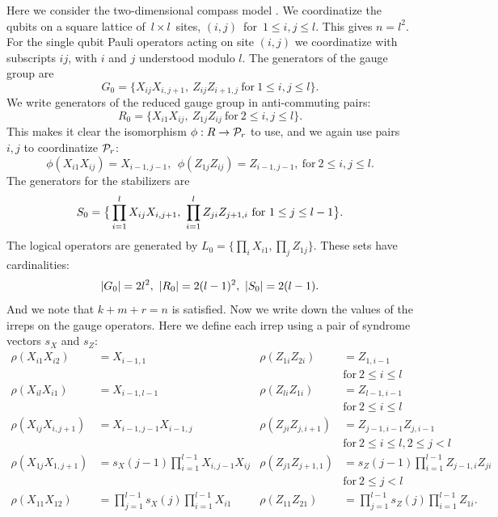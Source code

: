 \documentclass[12pt]{article}
\begin{document}
Here we consider the two-dimensional compass model \cite{Bacon2006}.
We coordinatize the qubits on a square 
lattice of\ $l\times l$\ sites,
$(i, j)$\ for\ $1\le i, j\le l.$
This gives $n = l^2.$
For the single qubit Pauli operators acting on site
$(i, j)$ we coordinatize with subscripts $ij$, 
with $i$ and $j$ understood modulo $l$.
The generators of the gauge group are
$$
    G_0 = \big\{ X_{ij}X_{i,j+1},\ Z_{ij}Z_{i+1,j}\ \mbox{for}\ 1\le i, j\le l\big\}.
$$
We write generators of the reduced
gauge group in anti-commuting pairs:
$$
    R_0 = \big\{ X_{i1}X_{ij},\ Z_{1j}Z_{ij}\ \mbox{for}\ 2\le i, j\le l\big\}.
$$
This makes it clear the isomorphism $\phi : R \to \mathcal{P}_r$ to use,
and we again use pairs $i,j$ to coordinatize $\mathcal{P}_r$:
$$
    \phi(X_{i1}X_{ij}) = X_{i-1,j-1}, \ \ \phi(Z_{1j}Z_{ij}) = Z_{i-1,j-1},\ \mbox{for}\ 2\le i, j\le l.
$$
The generators for the stabilizers are
$$
    \Stab_0 = \big\{ \prod_{i=1}^l X_{ij}X_{i,j+1},\ \prod_{i=1}^l Z_{ji}Z_{j+1,i}\ \mbox{for}\ 1\le j\le l-1\big\}.
$$
The logical operators are generated by $L_0 = \big\{ \prod_i X_{i1}, \prod_j Z_{1j} \}.$
These sets have cardinalities:
$$|G_0|=2l^2,\ |R_0| = 2(l-1)^2,\ |\Stab_0| = 2(l-1).$$
And we note that $k+m+r=n$ is satisfied.
Now we write down the values of the
irreps on the gauge operators.
Here we define each irrep using a pair 
of syndrome vectors $s_X$ and $s_Z:$
\begin{align*}
\rho(X_{i1} X_{i2}) &= X_{i-1,1} &
\rho(Z_{1i} Z_{2i}) &= Z_{1,i-1} \\&&&\mbox{for}\ 2\le i\le l\\
\rho(X_{il} X_{i1}) &= X_{i-1,l-1} &
\rho(Z_{li} Z_{1i}) &= Z_{l-1,i-1} \\&&&\mbox{for}\ 2\le i\le l\\
\rho(X_{ij} X_{i,j+1}) &= X_{i-1,j-1} X_{i-1,j} &
\rho(Z_{ji} Z_{j,i+1}) &= Z_{j-1,i-1}Z_{j,i-1} \\&&&\mbox{for}\ 2\le i\le l, 2\le j<l\\
\rho(X_{1j} X_{1,j+1}) &= s_X(j-1) \prod_{i=1}^{l-1} X_{i,j-1} X_{ij} &
\rho(Z_{j1} Z_{j+1,1}) &= s_Z(j-1) \prod_{i=1}^{l-1} Z_{j-1,i} Z_{ji} \\&&&\mbox{for}\ 2\le j<l\\
\rho(X_{11} X_{12}) &= \prod_{j=1}^{l-1}s_X(j) \prod_{i=1}^{l-1} X_{i1} &
\rho(Z_{11} Z_{21}) &= \prod_{j=1}^{l-1}s_Z(j) \prod_{i=1}^{l-1} Z_{1i}.
\end{align*}
\end{document}
